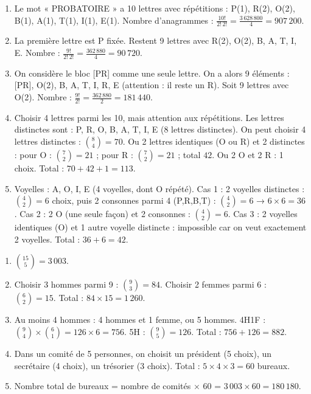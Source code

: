 \begin{enumerate}[label=\arabic*)]
    \item Le mot « PROBATOIRE » a 10 lettres avec répétitions : P(1), R(2), O(2), B(1), A(1), T(1), I(1), E(1). Nombre d'anagrammes : $\frac{10!}{2!\,2!} = \frac{3\,628\,800}{4} = 907\,200$.
    \item La première lettre est P fixée. Restent 9 lettres avec R(2), O(2), B, A, T, I, E. Nombre : $\frac{9!}{2!\,2!} = \frac{362\,880}{4} = 90\,720$.
    \item On considère le bloc [PR] comme une seule lettre. On a alors 9 éléments : [PR], O(2), B, A, T, I, R, E (attention : il reste un R). Soit 9 lettres avec O(2). Nombre : $\frac{9!}{2!} = \frac{362\,880}{2} = 181\,440$.
    \item Choisir 4 lettres parmi les 10, mais attention aux répétitions. Les lettres distinctes sont : P, R, O, B, A, T, I, E (8 lettres distinctes). On peut choisir 4 lettres distinctes : $\binom{8}{4}=70$. Ou 2 lettres identiques (O ou R) et 2 distinctes : pour O : $\binom{7}{2}=21$ ; pour R : $\binom{7}{2}=21$ ; total $42$. Ou 2 O et 2 R : 1 choix. Total : $70+42+1=113$.
    \item Voyelles : A, O, I, E (4 voyelles, dont O répété). Cas 1 : 2 voyelles distinctes : $\binom{4}{2}=6$ choix, puis 2 consonnes parmi 4 (P,R,B,T) : $\binom{4}{2}=6$ → $6\times6=36$. Cas 2 : 2 O (une seule façon) et 2 consonnes : $\binom{4}{2}=6$. Cas 3 : 2 voyelles identiques (O) et 1 autre voyelle distincte : impossible car on veut exactement 2 voyelles. Total : $36+6=42$.
\end{enumerate}

\begin{enumerate}[label=\arabic*)]
    \item $\binom{15}{5} = 3\,003$.
    \item Choisir 3 hommes parmi 9 : $\binom{9}{3}=84$. Choisir 2 femmes parmi 6 : $\binom{6}{2}=15$. Total : $84 \times 15 = 1\,260$.
    \item Au moins 4 hommes : 4 hommes et 1 femme, ou 5 hommes. 4H1F : $\binom{9}{4}\times\binom{6}{1}=126\times6=756$. 5H : $\binom{9}{5}=126$. Total : $756+126=882$.
    \item Dans un comité de 5 personnes, on choisit un président (5 choix), un secrétaire (4 choix), un trésorier (3 choix). Total : $5 \times 4 \times 3 = 60$ bureaux.
    \item Nombre total de bureaux = nombre de comités $\times$ 60 = $3\,003 \times 60 = 180\,180$.
\end{enumerate}
